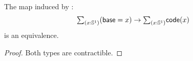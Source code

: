 \begin{cor}\label{thm:encode-total-equiv}
  The map induced by \encode:
  \[ \tsm{x:\Sn^1} (\base=x) \to \tsm{x:\Sn^1}\code(x) \]
  is an equivalence.
\end{cor}
\begin{proof}
  Both types are contractible.
\end{proof}

